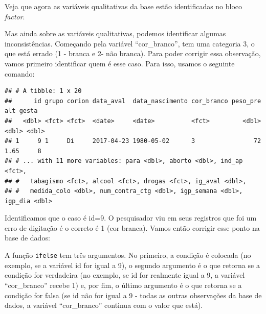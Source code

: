 \documentclass[
]{book}
\newenvironment{Shaded}{\begin{snugshade}}{\end{snugshade}}
\newcommand{\CommentTok}[1]{\textcolor[rgb]{0.56,0.35,0.01}{\textit{#1}}}
\newcommand{\DecValTok}[1]{\textcolor[rgb]{0.00,0.00,0.81}{#1}}
\newcommand{\KeywordTok}[1]{\textcolor[rgb]{0.13,0.29,0.53}{\textbf{#1}}}
\newcommand{\NormalTok}[1]{#1}
\newcommand{\OperatorTok}[1]{\textcolor[rgb]{0.81,0.36,0.00}{\textbf{#1}}}
\newcommand{\StringTok}[1]{\textcolor[rgb]{0.31,0.60,0.02}{#1}}
\begin{document}
Veja que agora as variáveis qualitativas da base estão identificadas no bloco \emph{factor}.

Mas ainda sobre as variáveis qualitativas, podemos identificar algumas inconsistências. Começando pela variável ``cor\_branco'', tem uma categoria 3, o que está errado (1 - branca e 2- não branca). Para poder corrigir essa observação, vamos primeiro identificar quem é esse caso. Para isso, usamos o seguinte comando:

\begin{Shaded}
\end{Shaded}

\begin{verbatim}
## # A tibble: 1 x 20
##      id grupo corion data_aval  data_nascimento cor_branco peso_pre   alt gesta
##   <dbl> <fct> <fct>  <date>     <date>          <fct>         <dbl> <dbl> <dbl>
## 1     9 1     Di     2017-04-23 1980-05-02      3                72  1.65     8
## # ... with 11 more variables: para <dbl>, aborto <dbl>, ind_ap <fct>,
## #   tabagismo <fct>, alcool <fct>, drogas <fct>, ig_aval <dbl>,
## #   medida_colo <dbl>, num_contra_ctg <dbl>, igp_semana <dbl>, igp_dia <dbl>
\end{verbatim}

Identificamos que o caso é id=9. O pesquisador viu em seus registros que foi um erro de digitação é o correto é 1 (cor branca). Vamos então corrigir esse ponto na base de dados:

\begin{Shaded}
\end{Shaded}

A função \texttt{ifelse} tem três argumentos. No primeiro, a condição é colocada (no exemplo, se a variável id for igual a 9), o segundo argumento é o que retorna se a condição for verdadeira (no exemplo, se id for realmente igual a 9, a variável ``cor\_branco'' recebe 1) e, por fim, o último argumento é o que retorna se a condição for falsa (se id não for igual a 9 - todas as outras observações da base de dados, a variável ``cor\_branco'' continua com o valor que está).
\end{document}
